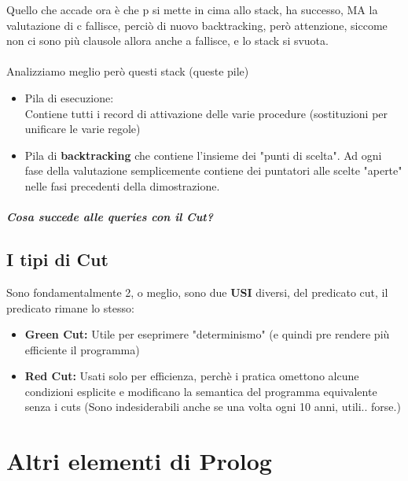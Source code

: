 \documentclass[12pt, a4paper, openany, oneside]{book}
\begin{document}
Quello che accade ora è che p si mette in cima allo stack, ha successo, MA
la valutazione di c fallisce, perciò di nuovo backtracking, però attenzione,
siccome non ci sono più clausole allora anche a fallisce, e lo stack si svuota.
\\ \\
Analizziamo meglio però questi stack (queste pile)
\begin{itemize}
	\item Pila di esecuzione: \\
	Contiene tutti i record di attivazione delle varie procedure (sostituzioni
	per unificare le varie regole)
	\item Pila di \color{red}\textbf{backtracking} \color{black} che contiene 
	l'insieme dei "punti di scelta". Ad ogni fase della valutazione semplicemente
	contiene dei puntatori alle scelte "aperte" nelle fasi precedenti della
	dimostrazione.
\end{itemize}
\paragraph{Cosa succede alle queries con il Cut?}
\section{I tipi di Cut}
Sono fondamentalmente 2, o meglio, sono due \textbf{USI} diversi, del predicato
cut, il predicato rimane lo stesso:
\begin{itemize}
	\item \color{green}\textbf{Green Cut: }\color{black} Utile per eseprimere 
	"determinismo" (e quindi pre rendere più efficiente il programma)
	\item \color{red}\textbf{Red Cut: }\color{black} Usati solo per efficienza,
	perchè i pratica omettono alcune condizioni esplicite e modificano la 
	semantica del programma equivalente senza i cuts (Sono indesiderabili anche
	se una volta ogni 10 anni, utili.. forse.)
\end{itemize}
\chapter{Altri elementi di Prolog}
\end{document}

